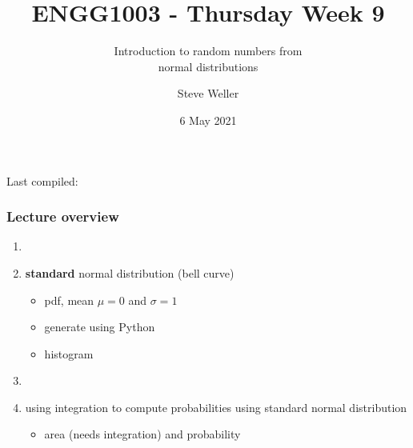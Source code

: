 \documentclass[english,14pt]{beamer}
\title{ENGG1003 - Thursday Week 9}
\subtitle{Introduction to random numbers from \\ normal distributions}
\author{Steve Weller}
\institute{University of Newcastle}
\date{6 May 2021}
\begin{document}
\begin{flushleft}
{\scriptsize Last compiled:~\DTMnow}
\vspace*{-5mm}
\end{flushleft}
\framebreak


\begin{frame}[fragile]

\frametitle{Lecture overview}
\begin{enumerate}

	\item[]
	
	\item \textbf{standard} normal distribution (bell curve)
	\begin{itemize}
		\item pdf, mean $\mu = 0$ and $\sigma = 1$ %
		\item generate using Python
		\item histogram
	\end{itemize}
	
	\item[]
	
	\item using integration to compute probabilities using standard normal distribution
	\begin{itemize}
		\item area (needs integration) and probability
	\end{itemize}
	
%	
	
%	
	
\end{enumerate}

\end{frame}
\end{document}
